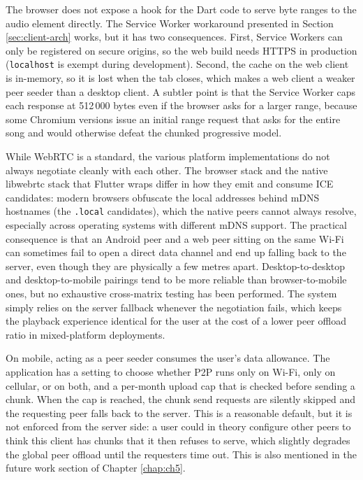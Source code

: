\indent \par The browser does not expose a hook for the Dart code to serve byte ranges to the audio element directly. The Service Worker workaround presented in Section \ref{sec:client-arch} works, but it has two consequences. First, Service Workers can only be registered on secure origins, so the web build needs HTTPS in production (\texttt{localhost} is exempt during development). Second, the cache on the web client is in-memory, so it is lost when the tab closes, which makes a web client a weaker peer seeder than a desktop client. A subtler point is that the Service Worker caps each response at 512\,000 bytes even if the browser asks for a larger range, because some Chromium versions issue an initial range request that asks for the entire song and would otherwise defeat the chunked progressive model.

\indent \par While WebRTC is a standard, the various platform implementations do not always negotiate cleanly with each other. The browser stack and the native libwebrtc stack that Flutter wraps differ in how they emit and consume ICE candidates: modern browsers obfuscate the local addresses behind mDNS hostnames (the \texttt{.local} candidates), which the native peers cannot always resolve, especially across operating systems with different mDNS support. The practical consequence is that an Android peer and a web peer sitting on the same Wi-Fi can sometimes fail to open a direct data channel and end up falling back to the server, even though they are physically a few metres apart. Desktop-to-desktop and desktop-to-mobile pairings tend to be more reliable than browser-to-mobile ones, but no exhaustive cross-matrix testing has been performed. The system simply relies on the server fallback whenever the negotiation fails, which keeps the playback experience identical for the user at the cost of a lower peer offload ratio in mixed-platform deployments.

\indent \par On mobile, acting as a peer seeder consumes the user's data allowance. The application has a setting to choose whether P2P runs only on Wi-Fi, only on cellular, or on both, and a per-month upload cap that is checked before sending a chunk. When the cap is reached, the chunk send requests are silently skipped and the requesting peer falls back to the server. This is a reasonable default, but it is not enforced from the server side: a user could in theory configure other peers to think this client has chunks that it then refuses to serve, which slightly degrades the global peer offload until the requesters time out. This is also mentioned in the future work section of Chapter \ref{chap:ch5}.

